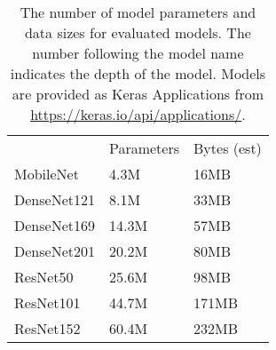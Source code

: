 \begin{table}
    \centering
    \caption[Characteristics of DL Models Evaluated with PAP-Awareness]{
        The number of model parameters and data sizes for evaluated models.
        The number following the model name indicates the depth of the model.
        Models are provided as Keras Applications from \url{https://keras.io/api/applications/}.
    }
    \begin{tabular}{lll}
    ~           & Parameters & Bytes (est) \\
    MobileNet   & 4.3M       & 16MB      \\
    DenseNet121 & 8.1M       & 33MB      \\
    DenseNet169 & 14.3M      & 57MB      \\
    DenseNet201 & 20.2M      & 80MB      \\
    ResNet50    & 25.6M      & 98MB     \\
    ResNet101   & 44.7M      & 171MB     \\
    ResNet152   & 60.4M      & 232MB     \\
    \end{tabular}
    \label{tbl:hvd_model_chars}
\end{table}